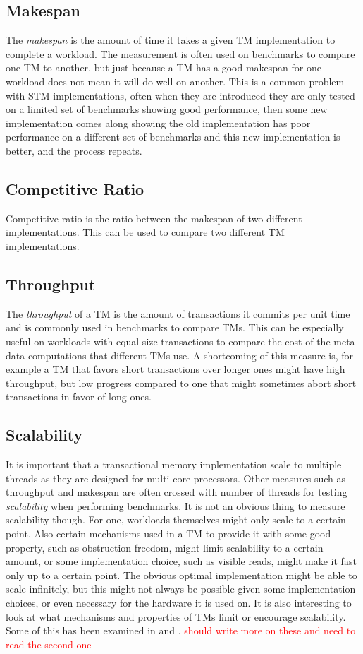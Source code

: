\subsection{Makespan}
The \emph{makespan} is the amount of time it takes a given TM implementation to complete a workload.
The measurement is often used on benchmarks to compare one TM to another, but just because a TM has a good makespan for one workload does not mean it will do well on another.
This is a common problem with STM implementations, often when they are introduced they are only tested on a limited set of benchmarks showing good performance, then some new implementation comes along showing the old implementation has poor performance on a different set of benchmarks and this new implementation is better, and the process repeats.

\subsection{Competitive Ratio}
Competitive ratio is the ratio between the makespan of two different implementations.
This can be used to compare two different TM implementations.

\subsection{Throughput}
The \emph{throughput} of a TM is the amount of transactions it commits per unit time and is commonly used in benchmarks to compare TMs.
This can be especially useful on workloads with equal size transactions to compare the cost of the meta data computations that different TMs use.
A shortcoming of this measure is, for example a TM that favors short transactions over longer ones might have high throughput, but low progress compared to one that might sometimes abort short transactions in favor of long ones.

\subsection{Scalability}
It is important that a transactional memory implementation scale to multiple threads as they are designed for multi-core processors.
Other measures such as throughput and makespan are often crossed with number of threads for testing \emph{scalability} when performing benchmarks.
It is not an obvious thing to measure scalability though.
For one, workloads themselves might only scale to a certain point.
Also certain mechanisms used in a TM to provide it with some good property, such as obstruction freedom, might limit scalability to a certain amount, or some implementation choice, such as visible reads, might make it fast only up to a certain point.
The obvious optimal implementation might be able to scale infinitely, but this might not always be possible given some implementation choices, or even necessary for the hardware it is used on.
It is also interesting to look at what mechanisms and properties of TMs limit or encourage scalability.
Some of this has been examined in \cite{lev:anatomy:transact:2009} and \cite{1584015}. \textcolor{Red}{should write more on these and need to read the second one}

